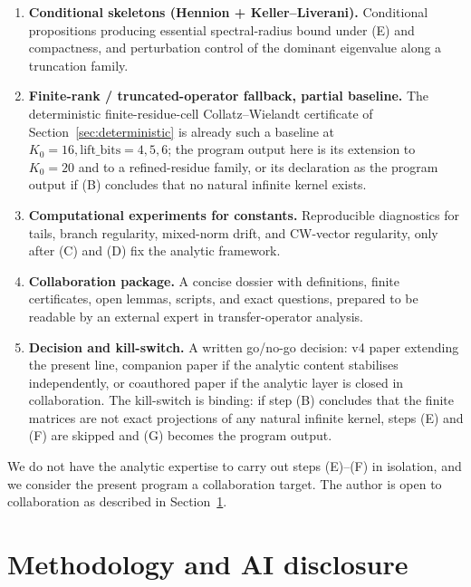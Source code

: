 \documentclass[11pt,a4paper]{article}
\theoremstyle{definition}
\begin{document}
\begin{enumerate}
  \item \textbf{Conditional skeletons (Hennion + Keller--Liverani).}
        Conditional propositions producing essential
        spectral-radius bound under (E) and compactness, and
        perturbation control of the dominant eigenvalue along
        a truncation family.
  \item \textbf{Finite-rank / truncated-operator fallback,
        partial baseline.} The deterministic finite-residue-cell
        Collatz--Wielandt certificate of
        Section~\ref{sec:deterministic} is already such a
        baseline at $K_0 = 16, \mathrm{lift\_bits} = 4, 5, 6$;
        the program output here is its extension to $K_0 = 20$
        and to a refined-residue family, or its declaration as
        the program output if (B) concludes that no natural
        infinite kernel exists.
  \item \textbf{Computational experiments for constants.}
        Reproducible diagnostics for tails, branch regularity,
        mixed-norm drift, and CW-vector regularity, only after
        (C) and (D) fix the analytic framework.
  \item \textbf{Collaboration package.} A concise dossier with
        definitions, finite certificates, open lemmas, scripts,
        and exact questions, prepared to be readable by an
        external expert in transfer-operator analysis.
  \item \textbf{Decision and kill-switch.} A written
        go/no-go decision: v4 paper extending the present line,
        companion paper if the analytic content stabilises
        independently, or coauthored paper if the analytic
        layer is closed in collaboration. The kill-switch is
        binding: if step (B) concludes that the finite matrices
        are not exact projections of any natural infinite
        kernel, steps (E) and (F) are skipped and (G) becomes
        the program output.
\end{enumerate}
We do not have the analytic expertise to carry out steps
(E)--(F) in isolation, and we consider the present program a
collaboration target. The author is open to collaboration as
described in Section~\ref{sec:methodology}.

\section{Methodology and AI disclosure}
\label{sec:methodology}
\end{document}
